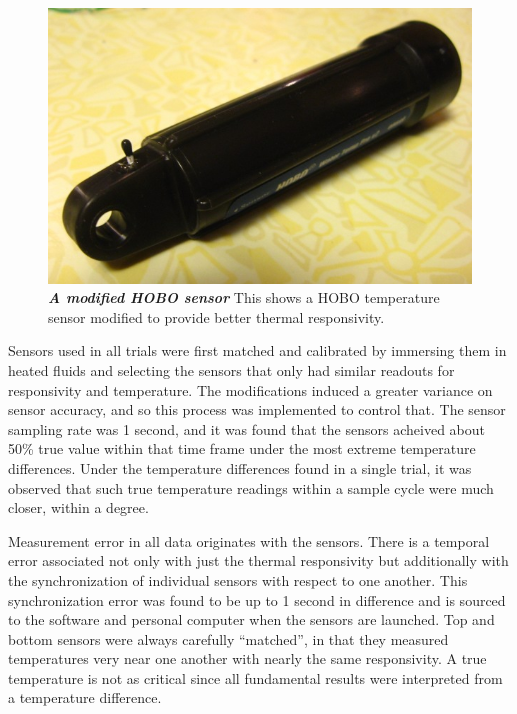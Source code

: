 \begin{center}
\begin{figure} [h!]
 \centering\includegraphics[scale=0.8]{modSensor.jpg}
 \caption[Modified HOBO Sensor]{\textbf{\emph{A modified HOBO sensor}} This shows a HOBO temperature sensor modified to provide better thermal responsivity.\label{modSens}}
\end{figure}
\end{center}

Sensors used in all trials were first matched and calibrated by immersing them in heated fluids and selecting the sensors that only had similar readouts for responsivity and temperature. The modifications induced a greater variance on sensor accuracy, and so this process was implemented to control that. The sensor sampling rate was 1 second, and it was found that the sensors acheived about 50\% true value within that time frame under the most extreme temperature differences. Under the temperature differences found in a single trial, it was observed that such true temperature readings within a sample cycle were much closer, within a degree. 

Measurement error in all data originates with the sensors. There is a temporal error associated not only with just the thermal responsivity but additionally with the synchronization of individual sensors with respect to one another. This synchronization error was found to be up to 1 second in difference and is sourced to the software and personal computer when the sensors are launched. Top and bottom sensors were always carefully ``matched'', in that they measured temperatures very near one another with nearly the same responsivity. A true temperature is not as critical since all fundamental results were interpreted from a temperature difference.

